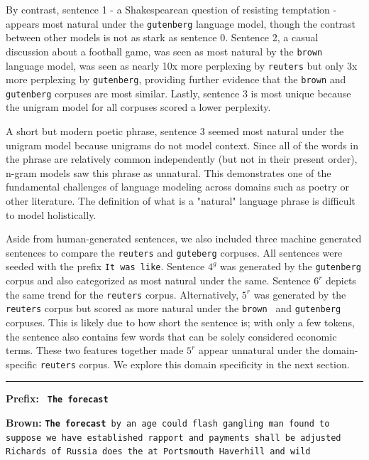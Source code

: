\documentclass[11pt,a4paper]{article}
\begin{document}
By contrast, sentence 1 - a Shakespearean question of resisting temptation - appears most natural under the \texttt{gutenberg} language model, though the contrast between other models is not as stark as sentence 0. Sentence 2, a casual discussion about a football game, was seen as most natural by the \texttt{brown} language model, was seen as nearly 10x more perplexing by \texttt{reuters} but only 3x more perplexing by \texttt{gutenberg}, providing further evidence that the \texttt{brown} and \texttt{gutenberg} corpuses are most similar. Lastly, sentence 3 is most unique because the unigram model for all corpuses scored a lower perplexity. 

A short but modern poetic phrase, sentence 3 seemed most natural under the unigram model because unigrams do not model context. Since all of the words in the phrase are relatively common independently (but not in their present order), n-gram models saw this phrase as unnatural. This demonstrates one of the fundamental challenges of language modeling across domains such as poetry or other literature. The definition of what is a "natural" language phrase is difficult to model holistically. 

Aside from human-generated sentences, we also included three machine generated sentences to compare the \texttt{reuters} and \texttt{guteberg} corpuses. All sentences were seeded with the prefix \texttt{It was like}. Sentence $4^{g}$ was generated by the \texttt{gutenberg} corpus and also categorized as most natural under the same. Sentence $6^{r}$ depicts the same trend for the \texttt{reuters} corpus. Alternatively, $5^{r}$ was generated by the \texttt{reuters} corpus but scored as more natural under the \texttt{brown } and \texttt{gutenberg} corpuses. This is likely due to how short the sentence is; with only a few tokens, the sentence also contains few words that can be solely considered economic terms. These two features together made $5^{r}$ appear unnatural under the domain-specific \texttt{reuters} corpus. We explore this domain specificity in the next section.



\rule{0.49\textwidth}{0.4pt}
\label{forecast_ex}
\textbf{Prefix:} \texttt{ \textbf{The forecast} }
\vspace{1mm}

\textbf{Brown:} \texttt{\textbf{The forecast} by an age could flash gangling man found to suppose we have established rapport and payments shall be adjusted Richards of Russia does the at Portsmouth Haverhill and wild}
\vspace{1mm}
\end{document}
